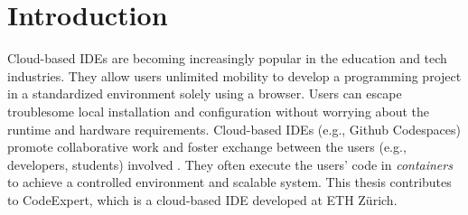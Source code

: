 \newcommand{\package}{\emph}
\theoremstyle{plain}
\theoremsymbol{}
\newtheorem{Def}[theorem]{Definition}
\chapter{Introduction}
Cloud-based IDEs are becoming increasingly popular in the education and tech industries. They allow users unlimited mobility to develop a programming project in a standardized environment solely using a browser. Users can escape troublesome local installation and configuration without worrying about the runtime and hardware requirements. Cloud-based IDEs (e.g., Github Codespaces) promote collaborative work and foster exchange between the users (e.g., developers, students) involved \cite{CodespacesEducators}\cite{CodespacesDevelopers}. They often execute the users' code in \emph{containers} to achieve a controlled environment and scalable system. This thesis contributes to CodeExpert, which is a cloud-based IDE developed at ETH Zürich.

